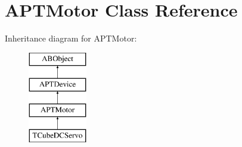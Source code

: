 \hypertarget{class_a_p_t_motor}{}\section{A\+P\+T\+Motor Class Reference}
\label{class_a_p_t_motor}
Inheritance diagram for A\+P\+T\+Motor\+:\begin{figure}[H]
\begin{center}
\leavevmode
\includegraphics[height=4.000000cm]{class_a_p_t_motor}
\end{center}
\end{figure}
